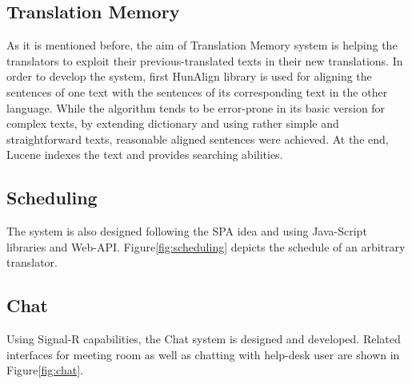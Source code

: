 \subsection{Translation Memory}
As it is mentioned before, the aim of Translation Memory system is helping the translators to exploit their previous-translated texts in their new translations. In order to develop the system, first HunAlign library is used for aligning the sentences of one text with the sentences of its corresponding text in the other language. While the algorithm tends to be error-prone in its basic version for complex texts, by extending dictionary and using rather simple and straightforward texts, reasonable aligned sentences were achieved. At the end, Lucene indexes the text and provides searching abilities.

\subsection{Scheduling}
The system is also designed following the SPA idea and using Java-Script libraries and Web-API. Figure\ref{fig:scheduling} depicts the schedule of an arbitrary translator.

\subsection{Chat}
Using Signal-R capabilities, the Chat system is designed and developed. Related interfaces for meeting room as well as chatting with help-desk user are shown in Figure\ref{fig:chat}.


